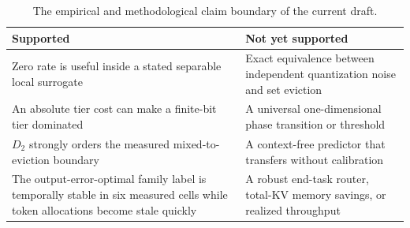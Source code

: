 \begin{table}[h]
\centering
\small
\begin{tabular}{@{}p{}p{}@{}}
\toprule
\textbf{Supported} & \textbf{Not yet supported} \\
\midrule
Zero rate is useful inside a stated separable local surrogate
& Exact equivalence between independent quantization noise and set eviction \\
An absolute tier cost can make a finite-bit tier dominated
& A universal one-dimensional phase transition or threshold \\
$D_2$ strongly orders the measured mixed-to-eviction boundary
& A context-free predictor that transfers without calibration \\
The output-error-optimal family label is temporally stable in six measured cells while token allocations become stale quickly
& A robust end-task router, total-KV memory savings, or realized throughput \\
\bottomrule
\end{tabular}
\caption{The empirical and methodological claim boundary of the current draft.}
\label{tab:app-claims}
\end{table}
